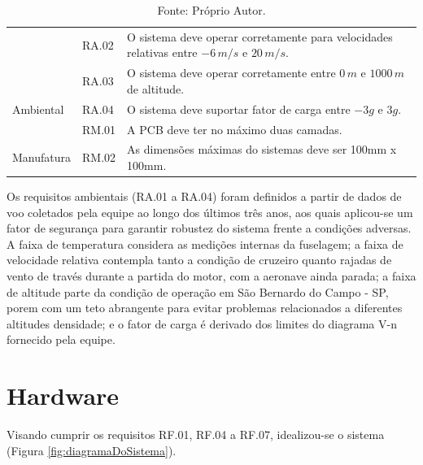 \begin{table}[H]
{\begin{tabular}{|l|l|l|}
                                                                 & RA.02                                                               & O sistema deve operar corretamente para velocidades relativas entre $-6\,m/s$ e $20\,m/s$. \\ \cline{2-3}
                                                                 & RA.03                                                               & O sistema deve operar corretamente entre $0\,m$ e $1000\,m$ de altitude. \\ \cline{2-3}
\multirow{-4}{*}{Ambiental}                                      & RA.04                                                               & O sistema deve suportar fator de carga entre $-3g$ e $3g$. \\ \hline
                                                                 & RM.01                                                               & A PCB deve ter no máximo duas camadas.                                        \\ \cline{2-3} 
\multirow{-2}{*}{Manufatura}                                     & RM.02                                                               & As dimensões máximas do sistemas deve ser 100mm x 100mm.                      \\ \hline
\end{tabular}}
\caption*{Fonte: Próprio Autor.}
\label{tab:requisitosDoEmbarcado}
\end{table}

Os requisitos ambientais (RA.01 a RA.04) foram definidos a partir de dados de voo coletados pela equipe ao longo dos últimos três anos, aos quais aplicou-se um fator de segurança para garantir robustez do sistema frente a condições adversas. A faixa de temperatura considera as medições internas da fuselagem; a faixa de velocidade relativa contempla tanto a condição de cruzeiro quanto rajadas de vento de través durante a partida do motor, com a aeronave ainda parada; a faixa de altitude parte da condição de operação em São Bernardo do Campo - SP, porem com um teto abrangente para evitar problemas relacionados a diferentes altitudes densidade; e o fator de carga é derivado dos limites do diagrama V-n fornecido pela equipe.

\section{Hardware}

Visando cumprir os requisitos RF.01, RF.04 a RF.07, idealizou-se o sistema (Figura \ref{fig:diagramaDoSistema}).

